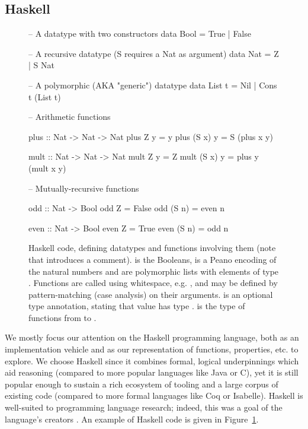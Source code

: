\subsection{Haskell}
\label{sec:haskell}

\begin{figure}
  \centering
  \begin{haskell}
-- A datatype with two constructors
data Bool = True | False

-- A recursive datatype (S requires a Nat as argument)
data Nat = Z | S Nat

-- A polymorphic (AKA "generic") datatype
data List t = Nil | Cons t (List t)

-- Arithmetic functions

plus :: Nat -> Nat -> Nat
plus    Z  y = y
plus (S x) y = S (plus x y)

mult :: Nat -> Nat -> Nat
mult    Z  y = Z
mult (S x) y = plus y (mult x y)

-- Mutually-recursive functions

odd :: Nat -> Bool
odd    Z  = False
odd (S n) = even n

even :: Nat -> Bool
even    Z  = True
even (S n) = odd n
  \end{haskell}
  \caption{Haskell code, defining datatypes and functions involving them (note
    that \hs{--} introduces a comment).  is the Booleans,  is a
    Peano encoding of the natural numbers and  are polymorphic lists
    with elements of type . Functions are called using whitespace, e.g.
    , and may be defined by pattern-matching (case analysis) on their
    arguments.  is an optional type annotation, stating that value
     has type .  is the type of functions from  to
    .}
  \label{fig:haskellexample}
\end{figure}

We mostly focus our attention on the Haskell programming language, both as an
implementation vehicle and as our representation of functions, properties, etc.
to explore. We choose Haskell since it combines formal, logical underpinnings
which aid reasoning (compared to more popular languages like Java or C), yet it
is still popular enough to sustain a rich ecosystem of tooling and a large
corpus of existing code (compared to more formal languages like Coq or
Isabelle). Haskell is well-suited to programming language research; indeed, this
was a goal of the language's creators \cite{marlow2010haskell}. An example of
Haskell code is given in Figure~\ref{fig:haskellexample}.

